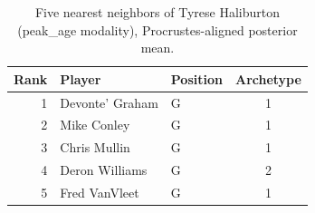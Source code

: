 \begin{table}[htbp]
  \centering\small
  \begin{tabular}{rllc}
    \toprule
    Rank & Player & Position & Archetype \\
    \midrule
    1 & Devonte' Graham & G & 1 \\
    2 & Mike Conley & G & 1 \\
    3 & Chris Mullin & G & 1 \\
    4 & Deron Williams & G & 2 \\
    5 & Fred VanVleet & G & 1 \\
    \bottomrule
  \end{tabular}
  \caption{Five nearest neighbors of Tyrese Haliburton (peak_age modality), Procrustes-aligned posterior mean.}
  \label{tab:Tyrese_Haliburton_neighbors_peak_age}
\end{table}

